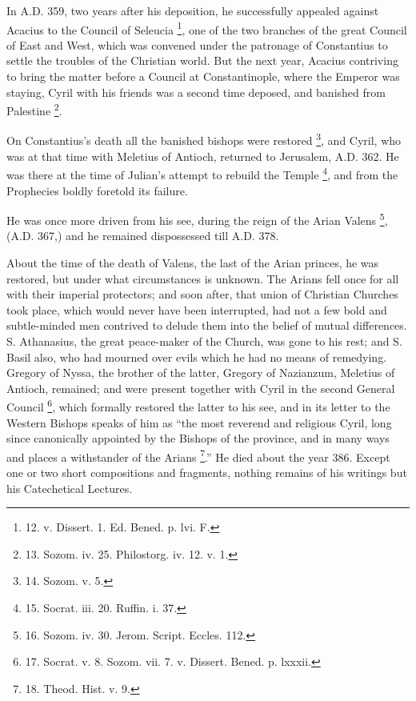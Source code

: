 In A.D.
359, two years after his deposition, he successfully appealed against
Acacius to the Council of Seleucia \footnote{12. v.
Dissert. 1. Ed. Bened. p. lvi. F.}, one of the two branches of the great Council of East and
West, which was convened under the patronage of Constantius to settle
the troubles of the Christian world. But the next year, Acacius
contriving to bring the matter before a Council at Constantinople,
where the Emperor was staying, Cyril with his friends was a second
time deposed, and banished from Palestine \footnote{13. Sozom.
iv. 25. Philostorg. iv. 12. v. 1.}.

On Constantius's death all the
banished bishops were restored \footnote{14. Sozom.
v. 5.}, and Cyril, who was at that time with Meletius of Antioch,
returned to Jerusalem, A.D. 362. He was
there at the time of Julian's attempt to rebuild the Temple \footnote{15.
Socrat. iii. 20. Ruffin. i. 37.}, and from the Prophecies boldly foretold its failure.

He was once more driven from
his see, during the reign of the Arian Valens \footnote{16. Sozom.
iv. 30. Jerom. Script. Eccles. 112.}, (A.D.
367,) and he remained dispossessed till A.D.
378.

About the time of the death of
Valens, the last of the Arian princes, he was restored, but under what
circumstances is unknown. The Arians fell once for all with their
imperial protectors; and soon after, that union of Christian Churches
took place, which would never have been interrupted, had not a few
bold and subtle-minded men contrived to delude them into the belief of
mutual differences. S. Athanasius, the great peace-maker of the
Church, was gone to his rest; and S. Basil also, who had mourned over
evils which he had no means of remedying. Gregory of Nyssa, the
brother of the latter, Gregory of Nazianzum, Meletius of Antioch,
remained; and were present together with Cyril in the second General
Council \footnote{17.
Socrat. v. 8. Sozom. vii. 7. v. Dissert. Bened. p. lxxxii.}, which
formally restored the latter to his see, and in its letter to the
Western Bishops speaks of him as ``the most reverend and religious
Cyril, long since canonically appointed by the Bishops of the
province, and in many ways and places a withstander of the Arians \footnote{18. Theod.
Hist. v. 9.}.'' He died about the year 386. Except one or two short
compositions and fragments, nothing remains of his writings but his
Catechetical Lectures.


